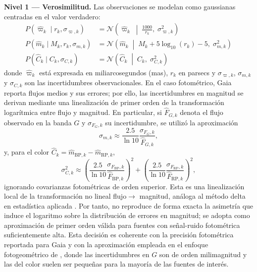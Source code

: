 \documentclass[stu, 12pt, letterpaper, donotrepeattitle, floatsintext, natbib]{apa7_ula}
\begin{document}
\textbf{Nivel 1 --- Verosimilitud.} Las observaciones se modelan
como gaussianas centradas en el valor verdadero:
\begin{align}
    P(\hat{\varpi}_k \mid r_k, \sigma_{\varpi,k}) &=
    \mathcal{N}\!\left(\hat{\varpi}_k \;\middle|\; \frac{1000}{r_k}, \;
    \sigma_{\varpi,k}^2\right) \label{eq:lik_plx} \\
    P(\hat{m}_k \mid M_k, r_k, \sigma_{m,k}) &=
    \mathcal{N}\!\left(\hat{m}_k \;\middle|\; M_k + 5\log_{10}(r_k) - 5, \;
    \sigma_{m,k}^2\right) \label{eq:lik_mag} \\
    P(\hat{C}_k \mid C_k, \sigma_{C,k}) &=
    \mathcal{N}\!\left(\hat{C}_k \;\middle|\; C_k, \;
    \sigma_{C,k}^2\right) \label{eq:lik_color}
\end{align}
donde $\hat{\varpi}_k$ está expresada en miliarcosegundos (mas), $r_k$
en parsecs y $\sigma_{\varpi,k}$, $\sigma_{m,k}$ y $\sigma_{C,k}$ son
las incertidumbres observacionales. En el caso fotométrico, Gaia
reporta flujos medios y sus errores; por ello, las incertidumbres en
magnitud se derivan mediante una linealización de primer orden de la
transformación logarítmica entre flujo y magnitud. En particular, si
$\hat{F}_{G,k}$ denota el flujo observado en la banda $G$ y
$\sigma_{F_G,k}$ su incertidumbre, se utilizó la aproximación
\begin{equation}
    \sigma_{m,k} \approx \frac{2.5}{\ln 10}
    \frac{\sigma_{F_G,k}}{\hat{F}_{G,k}},
    \label{eq:sigma_mag_flux}
\end{equation}
y, para el color $\hat{C}_k = \hat{m}_{\mathrm{BP},k} -
\hat{m}_{\mathrm{RP},k}$,
\begin{equation}
    \sigma_{C,k}^2 \approx
    \left(\frac{2.5}{\ln 10}
    \frac{\sigma_{F_{\mathrm{BP}},k}}{\hat{F}_{\mathrm{BP},k}}\right)^2 +
    \left(\frac{2.5}{\ln 10}
    \frac{\sigma_{F_{\mathrm{RP}},k}}{\hat{F}_{\mathrm{RP},k}}\right)^2,
    \label{eq:sigma_color_flux}
\end{equation}
ignorando covarianzas fotométricas de orden superior. Esta es una
linealización local de la transformación no lineal flujo$\rightarrow$
magnitud, análoga al método delta en estadística aplicada
\citep{Cox_Donnelly_2011}. Por tanto, no reproduce de forma exacta la
asimetría que induce el logaritmo sobre la distribución de errores en
magnitud; se adopta como aproximación de primer orden válida para
fuentes con señal-ruido fotométrica suficientemente alta. Esta decisión
es coherente con la precisión fotométrica reportada para Gaia y con la
aproximación empleada en el enfoque fotogeométrico de
\citet{2021AJ....161..147B}, donde las incertidumbres en $G$ son de
orden milimagnitud y las del color suelen ser pequeñas para la mayoría
de las fuentes de interés.
\end{document}
